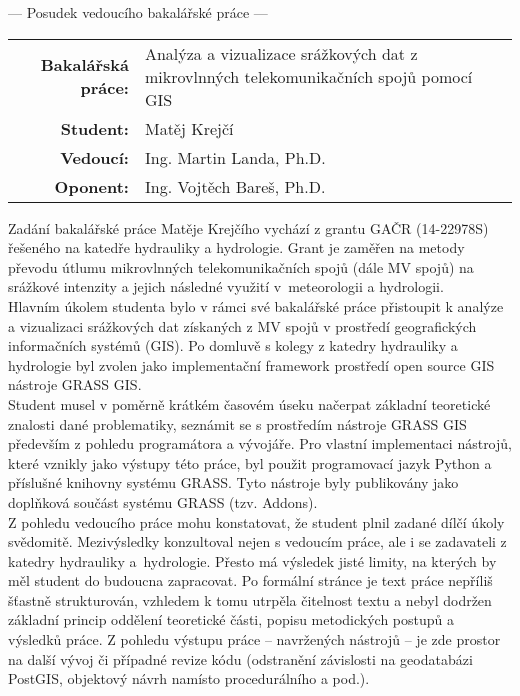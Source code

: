 \documentclass[czech,11pt,a4paper]{article}
\begin{document}
\begin{center}
  {\Large --- Posudek vedoucího bakalářské práce ---}
\end{center}

\vspace{.2cm}

\noindent \begin{tabular}{rp{}}
  {\bf Bakalářská práce:} & Analýza a vizualizace srážkových dat z mikrovlnných telekomunikačních spojů pomocí GIS \\
  {\bf Student:} & Matěj Krejčí \\
  {\bf Vedoucí:} & Ing. Martin Landa, Ph.D. \\
  {\bf Oponent:} & Ing. Vojtěch Bareš, Ph.D. \\
\end{tabular}

\vspace{1cm}

Zadání bakalářské práce Matěje Krejčího vychází z grantu GAČR
(14-22978S) řešeného na katedře hydrauliky a hydrologie. Grant je
zaměřen na metody převodu útlumu mikrovlnných telekomunikačních spojů
(dále MV spojů) na srážkové intenzity a jejich následné využití
v~meteorologii a hydrologii.  \\

Hlavním úkolem studenta bylo v rámci své bakalářské práce přistoupit k
analýze a vizualizaci srážkových dat získaných z MV spojů v prostředí
geografických informačních systémů (GIS). Po domluvě s kolegy z
katedry hydrauliky a hydrologie byl zvolen jako implementační
framework prostředí open source GIS nástroje GRASS GIS.  \\

Student musel v poměrně krátkém časovém úseku načerpat základní
teoretické znalosti dané problematiky, seznámit se s prostředím
nástroje GRASS GIS především z pohledu programátora a vývojáře. Pro
vlastní implementaci nástrojů, které vznikly jako výstupy této práce,
byl použit programovací jazyk Python a příslušné knihovny systému
GRASS. Tyto nástroje byly publikovány jako doplňková součást systému
GRASS (tzv. Addons).  \\

Z pohledu vedoucího práce mohu konstatovat, že student plnil zadané
dílčí úkoly svědomitě. Mezivýsledky konzultoval nejen s vedoucím
práce, ale i se zadavateli z katedry hydrauliky a~hydrologie. Přesto
má výsledek jisté limity, na kterých by měl student do budoucna
zapracovat. Po formální stránce je text práce nepříliš šťastně
strukturován, vzhledem k tomu utrpěla čitelnost textu a nebyl dodržen
základní princip oddělení teoretické části, popisu metodických postupů
a výsledků práce. Z pohledu výstupu práce -- navržených nástrojů -- je
zde prostor na další vývoj či případné revize kódu (odstranění
závislosti na geodatabázi PostGIS, objektový návrh namísto
procedurálního a pod.).  \\
\end{document}
